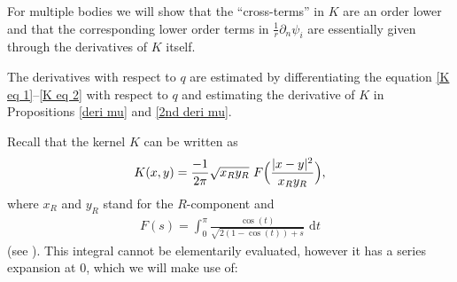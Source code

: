\documentclass[10pt]{amsart}
\theoremstyle{definition}
\newcommand\eq{=}
\newcommand\dd{\,\mathrm{d}}
\newcommand\dt{\dd t}
\let\de\partial
\begin{document}
For multiple bodies we will show that the ``cross-terms'' in $K$ are an order lower and that the corresponding lower order terms in $\frac{1}{r}\de_n\psi_i$ are essentially given through the derivatives of $K$ itself.

The derivatives with respect to $q$ are estimated by differentiating the equation \eqref{K eq 1}--\eqref{K eq 2} with respect to $q$ and estimating the derivative of $K$ in Propositions \ref{deri mu} and \ref{2nd deri mu}.

Recall that the kernel $K$ can be written as
\begin{align}\label{exp K}
K(x,y)\eq\frac{-1}{2\pi}\sqrt{x_Ry_R}\,\,F\Bigl(\frac{|x-y|^2}{x_Ry_R}\Bigr),
\end{align}
where $x_R$ and $y_R$ stand for the $R$-component and
\begin{align*}
F(s)\eq\int_0^\pi \frac{\cos(t)}{\sqrt{2(1-\cos(t))+s}}\,\dt
\end{align*}
(see \cite[\S 2]{GallaySverak}). This integral cannot be elementarily evaluated, however it has a series expansion at $0$, which we will make use of:
\end{document}
